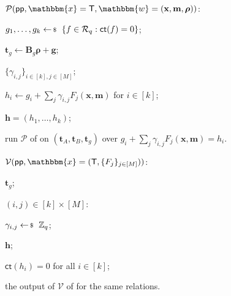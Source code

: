 \documentclass[../../book.tex]{subfiles}
\begin{document}
\begin{algoproto}[H]
    \small
    \centering
    \begin{mdframed}[linecolor=black, linewidth=1pt,
                     skipabove=10pt, skipbelow=10pt,
                     innerleftmargin=5pt, innerrightmargin=5pt]
        \begin{minipage}[t]{0.52\linewidth}
            \colorbox{oc-blue-1}{$\mathcal{P}(\mathsf{pp}, \mathbbm{x}=\mathsf{T}, \mathbbm{w}=(\mathbf{x}, \mathbf{m}, \boldsymbol{\rho}))$:}
            \begin{algoen}
                \item $g_1, \dots, g_k \leftarrowS \{f \in \mathcal{R}_q: \mathsf{ct}(f) = 0\}$;
                \item {} $\mathbf{t}_g \gets \mathbf{B}_g\boldsymbol{\rho} + \mathbf{g}$; 
                \item {} $\{\gamma_{i,j}\}_{i \in [k], j \in [M]}$;
                \item $h_i \gets g_i + \sum_{j} \gamma_{i,j}F_j(\mathbf{x}, \mathbf{m})$ for $i \in [k]$;
                \item {} $\mathbf{h} = (h_1, \dots, h_k)$;
                \item run $\mathcal{P}$ of  on $(\mathbf{t}_A, \mathbf{t}_B, \mathbf{t}_g)$ over $g_i + \sum_j \gamma_{i,j}F_j(\mathbf{x}, \mathbf{m}) = h_i$.
            \end{algoen}
        \end{minipage}
        \hfill
        \begin{minipage}[t]{0.44\linewidth}
            \colorbox{oc-blue-1}{$\mathcal{V}(\mathsf{pp}, \mathbbm{x}=(\mathsf{T}, \{F_j\}_{j \in [M]}))$:}
            \begin{algoen}
                \item {} $\mathbf{t}_g$;
                \item {} $(i,j) \in [k] \times [M]$:
                \item \hspace{5px} $\gamma_{i,j} \leftarrowS \mathbb{Z}_q$;
                \item {} $\mathbf{h}$;
                \item {} $\mathsf{ct}(h_i) = 0$ for all $i \in [k]$;
                \item {} the output of $\mathcal{V}$ of  for the same relations.
            \end{algoen}
        \end{minipage}
    \end{mdframed}
    \caption{Proof that the linear functions $F_1, \dots, F_M$ of the committed messages have zero constant coefficients~\cite[Fig.~5]{C:LyuNguPla22}. Here, $\mathbf{B}_g \leftarrowS \mathcal{R}_q^{k \times r}$ is an additional public matrix that appends $k$ slots to the BDLOP part of the commitment.}
    \label{fig:lnp22-ct}
\end{algoproto}
\end{document}
